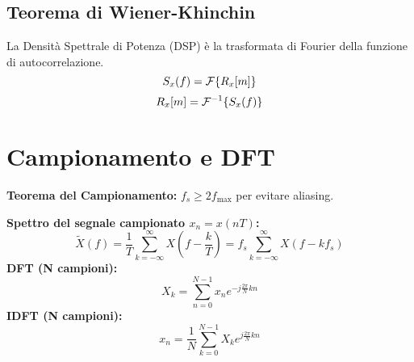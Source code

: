 \begin{multicols}{2}
\subsection*{Teorema di Wiener-Khinchin}
La Densità Spettrale di Potenza (DSP) è la trasformata di Fourier della funzione di autocorrelazione.
$$ S_x(f) = \mathcal{F}\{R_x[m]\} $$
$$ R_x[m] = \mathcal{F}^{-1}\{S_x(f)\} $$

\section{Campionamento e DFT}
\begin{definition}
\textbf{Teorema del Campionamento:} $f_s \ge 2 f_{\max}$ per evitare aliasing.
\end{definition}
\textbf{Spettro del segnale campionato $x_n = x(nT)$:}
$$ \tilde{X}(f) = \frac{1}{T} \sum_{k=-\infty}^{\infty} X\left(f - \frac{k}{T}\right) = f_s \sum_{k=-\infty}^{\infty} X(f - k f_s) $$
\textbf{DFT (N campioni):}
$$ X_k = \sum_{n=0}^{N-1} x_n e^{-j\frac{2\pi}{N}kn} $$
\textbf{IDFT (N campioni):}
$$ x_n = \frac{1}{N} \sum_{k=0}^{N-1} X_k e^{j\frac{2\pi}{N}kn} $$

\end{multicols}